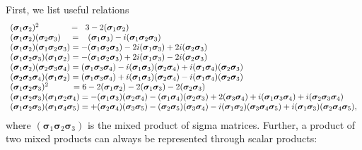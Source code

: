 \documentclass[a4paper]{jpconf}
\renewcommand\[{\begin{equation}}
\renewcommand\]{\end{equation}}
\newcommand{\ssigma}{{\bm \sigma}}
\begin{document}
 First, we list useful relations \cite{SqParam}
\[\begin{array}{l}
{({{\ssigma}_1}{{\ssigma}_2})^2}\qquad \quad {\mkern 1mu} {\mkern 1mu}  = \;\;{\mkern 1mu} 3 - 2({{\ssigma}_1}{{\ssigma}_2})\\
({{\ssigma}_1}{{\ssigma}_2})({{\ssigma}_2}{{\ssigma}_3})\;\;\;\; = \;\;\;({{\ssigma}_1}{{\ssigma}_3}) - i({{\ssigma}_1}{{\ssigma}_2}{{\ssigma}_3})\\
({{\ssigma}_1}{{\ssigma}_2})({{\ssigma}_1}{{\ssigma}_2}{{\ssigma}_3}) =  - ({{\ssigma}_1}{{\ssigma}_2}{{\ssigma}_3}) - 2i({{\ssigma}_1}{{\ssigma}_3}) + 2i({{\ssigma}_2}{{\ssigma}_3})\\
({{\ssigma}_1}{{\ssigma}_2}{{\ssigma}_3})({{\ssigma}_1}{{\ssigma}_2}) =  - ({{\ssigma}_1}{{\ssigma}_2}{{\ssigma}_3}) + 2i({{\ssigma}_1}{{\ssigma}_3}) - 2i({{\ssigma}_2}{{\ssigma}_3})\\
({{\ssigma}_1}{{\ssigma}_2})({{\ssigma}_2}{{\ssigma}_3}{{\ssigma}_4}) = ({{\ssigma}_1}{{\ssigma}_3}{{\ssigma}_4}) - i({{\ssigma}_1}{{\ssigma}_3})({{\ssigma}_2}{{\ssigma}_4}) + i({{\ssigma}_1}{{\ssigma}_4})({{\ssigma}_2}{{\ssigma}_3})\\
({{\ssigma}_2}{{\ssigma}_3}{{\ssigma}_4})({{\ssigma}_1}{{\ssigma}_2}) = ({{\ssigma}_1}{{\ssigma}_3}{{\ssigma}_4}) + i({{\ssigma}_1}{{\ssigma}_3})({{\ssigma}_2}{{\ssigma}_4}) - i({{\ssigma}_1}{{\ssigma}_4})({{\ssigma}_2}{{\ssigma}_3})\\
{({{\ssigma}_1}{{\ssigma}_2}{{\ssigma}_3})^2}{\mkern 1mu} {\mkern 1mu} {\mkern 1mu} \qquad {\mkern 1mu}  = 6 - 2({{\ssigma}_1}{{\ssigma}_2}) - 2({{\ssigma}_1}{{\ssigma}_3}) - 2({{\ssigma}_2}{{\ssigma}_3})\\
({{\ssigma}_1}{{\ssigma}_2}{{\ssigma}_3})({{\ssigma}_1}{{\ssigma}_2}{{\ssigma}_4}) =  - ({{\ssigma}_1}{{\ssigma}_3})({{\ssigma}_2}{{\ssigma}_4}) - ({{\ssigma}_1}{{\ssigma}_4})({{\ssigma}_2}{{\ssigma}_3}) + 2({{\ssigma}_3}{{\ssigma}_4}) + i({{\ssigma}_1}{{\ssigma}_3}{{\ssigma}_4}) + i({{\ssigma}_2}{{\ssigma}_3}{{\ssigma}_4})\\
({{\ssigma}_1}{{\ssigma}_2}{{\ssigma}_3})({{\ssigma}_1}{{\ssigma}_4}{{\ssigma}_5}) =  + ({{\ssigma}_2}{{\ssigma}_4})({{\ssigma}_3}{{\ssigma}_5}) - ({{\ssigma}_2}{{\ssigma}_5})({{\ssigma}_3}{{\ssigma}_4}) - i({{\ssigma}_1}{{\ssigma}_2})({{\ssigma}_3}{{\ssigma}_4}{{\ssigma}_5}) + i({{\ssigma}_1}{{\ssigma}_3})({{\ssigma}_2}{{\ssigma}_4}{{\ssigma}_5}),
\end{array}\]
where $({{\ssigma}_1}{{\ssigma}_2}{{\ssigma}_3})$ is the mixed product of sigma matrices. Further, a product of two mixed products can always be represented through scalar products:
\end{document}
